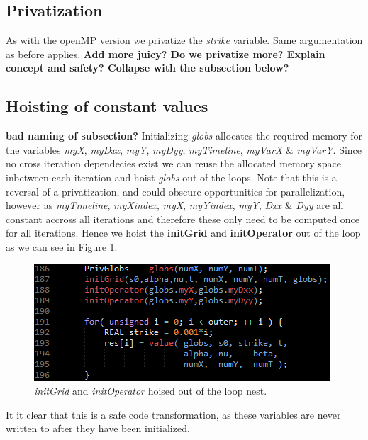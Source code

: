 \subsection{Privatization}
As with the openMP version we privatize the \emph{strike} variable. Same
argumentation as before applies.
\textbf{Add more juicy? Do we privatize more? Explain concept and safety? Collapse with the subsection below?}

\subsection{Hoisting of constant values}
\textbf{bad naming of subsection?}
Initializing \emph{globs} allocates the required memory for the variables
\emph{myX}, \emph{myDxx}, \emph{myY}, \emph{myDyy}, \emph{myTimeline},
\emph{myVarX} \& \emph{myVarY}. Since no cross iteration dependecies exist we
can reuse the allocated memory space inbetween each iteration and hoist
\emph{globs} out of the loops. Note that this is a reversal of a privatization,
and could obscure opportunities for parallelization, however as \emph{myTimeline}, \emph{myXindex},
\emph{myX}, \emph{myYindex}, \emph{myY}, \emph{Dxx} \& \emph{Dyy} are all
constant accross all iterations and therefore these only need to be computed
once for all iterations. Hence we hoist the \textbf{initGrid} and
\textbf{initOperator} out of the loop as we can see in Figure
\ref{fig:globsinit}.

\begin{figure}[!ht]
\centering
\includegraphics[scale=1]{input/figures/globsinit.png}
\caption{\emph{initGrid} and \emph{initOperator} hoised out of the loop nest.\label{fig:globsinit}}
\end{figure}
 
It it clear that this is a safe code transformation, as these variables are
never written to after they have been initialized.
